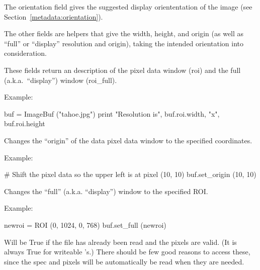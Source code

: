 The {\cf orientation} field gives the suggested display oriententation of
the image (see Section~\ref{metadata:orientation}).

The other fields are helpers that give the width, height, and origin
(as well as ``full'' or ``display'' resolution and origin), taking the
intended orientation into consideration.
\apiend

These fields return an \ROI description of the pixel data window
({\cf roi}) and the full (a.k.a.\ ``display'') window ({\cf roi_full}).

\noindent Example:
\begin{code}
    buf = ImageBuf ("tahoe.jpg")
    print "Resolution is", buf.roi.width, "x", buf.roi.height
\end{code}
\apiend

Changes the ``origin'' of the data pixel data window to the specified
coordinates.

\noindent Example:
\begin{code}
    # Shift the pixel data so the upper left is at pixel (10, 10)
    buf.set_origin (10, 10)
\end{code}
\apiend

Changes the ``full'' (a.k.a. ``display'') window to the specified ROI.

\noindent Example:
\begin{code}
    newroi = ROI (0, 1024, 0, 768)
    buf.set_full (newroi)
\end{code}
\apiend

Will be {\cf True} if the file has already been read and the pixels are
valid. (It is always {\cf True} for writeable \ImageBuf's.)
There should be few good reasons to access these, since the spec and pixels
will be automatically be read when they are needed. 
\apiend

